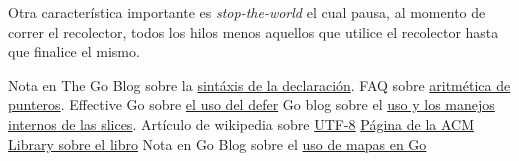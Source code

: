 \documentclass{article}
\begin{document}
Otra característica importante es \textit{stop-the-world} el cual pausa, al momento de correr el recolector, todos los hilos menos aquellos que utilice el recolector hasta que finalice el mismo. 

\begin{thebibliography}{99}
 Nota en The Go Blog sobre la \href{http://blog.golang.org/gos-declaration-syntax}{sintáxis de la declaración}.
 FAQ sobre \href{https://golang.org/doc/faq#no_pointer_arithmetic}{aritmética de punteros}.
 Effective Go sobre \href{https://golang.org/doc/effective_go.html#defer}{el uso del defer}
 Go blog sobre el \href{http://blog.golang.org/go-slices-usage-and-internals}{uso y los manejos internos de las slices}.
 Artículo de wikipedia sobre \href{https://es.wikipedia.org/wiki/UTF-8}{UTF-8}
 \href{http://dl.acm.org/citation.cfm?id=1243380}{Página de la ACM Library sobre el libro}
 Nota en Go Blog sobre el  \href{http://blog.golang.org/go-maps-in-action}{uso de mapas en Go}
\end{thebibliography}
\end{document}
